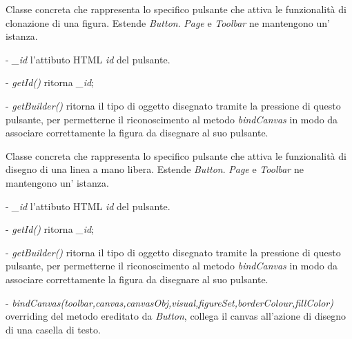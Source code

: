 Classe concreta che rappresenta lo specifico pulsante che attiva le funzionalit\` a di clonazione di una figura.
Estende \textit{Button}.
\textit{Page} e \textit{Toolbar} ne mantengono un' istanza.
\begin{elencopuntato}[\subsubsecindent]
\item[-] \textit{{\_}id} l'attibuto HTML \textit{id} del pulsante.
\end{elencopuntato}
\begin{elencopuntato}[\subsubsecindent]
\item[-] \textit{getId()} ritorna \textit{{\_}id};
\item[-] \textit{getBuilder()} ritorna il tipo di oggetto disegnato tramite la pressione di questo pulsante, per permetterne il riconoscimento al metodo \textit{bindCanvas} in modo da associare correttamente la figura da disegnare al suo pulsante.
\end{elencopuntato}

Classe concreta che rappresenta lo specifico pulsante che attiva le funzionalit\` a di disegno di una linea a mano libera.
Estende \textit{Button}.
\textit{Page} e \textit{Toolbar} ne mantengono un' istanza.
\begin{elencopuntato}[\subsubsecindent]
\item[-] \textit{{\_}id} l'attibuto HTML \textit{id} del pulsante.
\end{elencopuntato}
\begin{elencopuntato}[\subsubsecindent]
\item[-] \textit{getId()} ritorna \textit{{\_}id};
\item[-] \textit{getBuilder()} ritorna il tipo di oggetto disegnato tramite la pressione di questo pulsante, per permetterne il riconoscimento al metodo \textit{bindCanvas} in modo da associare correttamente la figura da disegnare al suo pulsante.
\item[-]  \textit{bindCanvas(toolbar,canvas,canvasObj,visual,figureSet,borderColour,fillColor)} overriding del metodo ereditato da \textit{Button}, collega il canvas all'azione di disegno di una casella di testo. 
\end{elencopuntato}

